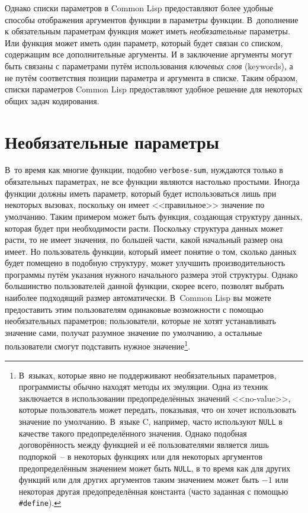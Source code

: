 Однако списки параметров в Common Lisp предоставляют более удобные способы отображения
аргументов функции в параметры функции.  В~дополнение к обязательным параметрам функция
может иметь \textit{необязательные} параметры.  Или функция может иметь один параметр,
который будет связан со списком, содержащим все дополнительные аргументы.  И в заключение
аргументы могут быть связаны с параметрами путём использования \textit{ключевых слов}
(keywords), а не путём соответствия позиции параметра и аргумента в списке.  Таким
образом, списки параметров Common Lisp предоставляют удобное решение для некоторых общих
задач кодирования.

\section{Необязательные параметры}

В~то время как многие функции, подобно \lstinline{verbose-sum}, нуждаются только в обязательных
параметрах, не все функции являются настолько простыми.  Иногда функции должны иметь
параметр, который будет использоваться лишь при некоторых вызовах, поскольку он имеет
<<правильное>> значение по умолчанию.  Таким примером может быть функция, создающая
структуру данных, которая будет при необходимости расти.  Поскольку структура данных может
расти, то не имеет значения, по большей части, какой начальный размер она имеет.  Но
пользователь функции, который имеет понятие о том, сколько данных будет помещено в
подобную структуру, может улучшить производительность программы путём указания нужного
начального размера этой структуры.  Однако большинство пользователей данной функции,
скорее всего, позволят выбрать наиболее подходящий размер автоматически.  В~Common Lisp вы
можете предоставить этим пользователям одинаковые возможности с помощью необязательных
параметров; пользователи, которые не хотят устанавливать значение сами, получат разумное
значение по умолчанию, а остальные пользователи смогут подставить нужное
значение\footnote{В~языках, которые явно не поддерживают необязательных параметров,
  программисты обычно находят методы их эмуляции.  Одна из техник заключается в
  использовании предопределённых значений <<no-value>>, которые пользователь может
  передать, показывая, что он хочет использовать значение по умолчанию.  В~языке C,
  например, часто используют \lstinline{NULL} в качестве такого предопределённого значения.
  Однако подобная договорённость между функцией и её пользователями является лишь
  подпоркой~-- в некоторых функциях или для некоторых аргументов предопределённым
  значением может быть \lstinline{NULL}, в то время как для других функций или для других
  аргументов таким значением может быть $-1$ или некоторая другая
  предопределённая константа (часто заданная с помощью \lstinline!#define!).}\hspace{\footnotenegspace}.

